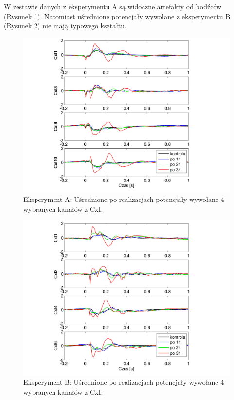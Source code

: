\documentclass{pracamgr}
\begin{document}
	W zestawie danych z eksperymentu A są widoczne artefakty od bodźców (Rysunek \ref{rys:kontrola15_CxI}). Natomiast uśrednione potencjały wywołane z eksperymentu B (Rysunek \ref{rys:beta3_CxI}) nie mają typowego kształtu. 
	
	\begin{figure}[h]
		\begin{center}
			\includegraphics[scale=0.8]{kontrola15_CxI.png}
		\end{center}
		\caption{Eksperyment A: Uśrednione po realizacjach potencjały wywołane 4 wybranych kanałów z CxI.}
		\label{rys:kontrola15_CxI}
	\end{figure}
	\FloatBarrier
	\begin{figure}[h]
		\begin{center}
			\includegraphics[scale=0.8]{beta3_CxI.png}
		\end{center}
		\caption{Eksperyment B: Uśrednione po realizacjach potencjały wywołane 4 wybranych kanałów z CxI.}
		\label{rys:beta3_CxI}
	\end{figure}
\end{document}
